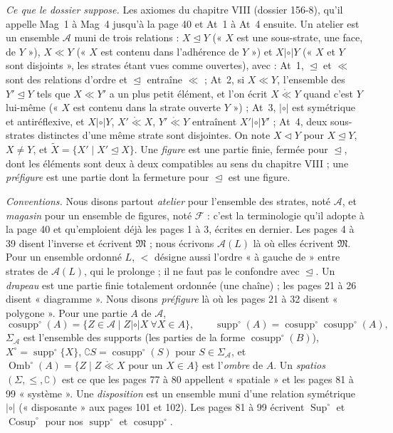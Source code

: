 \documentclass[11pt,a4paper]{article}
\begin{document}
\emph{Ce que le dossier suppose.} Les axiomes du chapitre VIII (dossier 156-8),
qu'il appelle Mag~1 à Mag~4 jusqu'à la page 40 et At~1 à At~4 ensuite. Un
atelier est un ensemble $\mathcal{A}$ muni de trois relations : $X
\trianglelefteq Y$ (« $X$ est une sous-strate, une face, de $Y$ »), $X \ll Y$
(« $X$ est contenu dans l'adhérence de $Y$ ») et $X \mathrel{|\circ|} Y$ (« $X$
et $Y$ sont disjoints », les strates étant vues comme ouvertes), avec : At~1,
$\trianglelefteq$ et $\ll$ sont des relations d'ordre et $\trianglelefteq$
entraîne $\ll$ ; At~2, si $X \ll Y$, l'ensemble des $Y' \trianglelefteq Y$ tels
que $X \ll Y'$ a un plus petit élément, et l'on écrit $X \mathrel{\mathring{\ll}}
Y$ quand c'est $Y$ lui-même (« $X$ est contenu dans la strate ouverte $Y$ ») ;
At~3, $\mathrel{|\circ|}$ est symétrique et antiréflexive, et $X \mathrel{|\circ|}
Y$, $X' \mathrel{\mathring{\ll}} X$, $Y' \mathrel{\mathring{\ll}} Y$ entraînent
$X' \mathrel{|\circ|} Y'$ ; At~4, deux sous-strates distinctes d'une même strate
sont disjointes. On note $X \lhd Y$ pour $X \trianglelefteq Y$, $X \neq Y$, et
$\widetilde{X} = \{X' \mid X' \trianglelefteq X\}$. Une \emph{figure} est une
partie finie, fermée pour $\trianglelefteq$, dont les éléments sont deux à deux
compatibles au sens du chapitre VIII ; une \emph{préfigure} est une partie dont
la fermeture pour $\trianglelefteq$ est une figure.

\emph{Conventions.} Nous disons partout \emph{atelier} pour l'ensemble des
strates, noté $\mathcal{A}$, et \emph{magasin} pour un ensemble de figures,
noté $\mathcal{F}$ : c'est la terminologie qu'il adopte à la page 40 et
qu'emploient déjà les pages 1 à 3, écrites en dernier. Les pages 4 à 39 disent
l'inverse et écrivent $\mathfrak{M}$ ; nous écrivons $\mathcal{A}(L)$ là où
elles écrivent $\mathfrak{M}$. Pour un ensemble ordonné $L$, $<$ désigne aussi
l'ordre « à gauche de » entre strates de $\mathcal{A}(L)$, qui le prolonge ; il
ne faut pas le confondre avec $\trianglelefteq$. Un \emph{drapeau} est une
partie finie totalement ordonnée (une chaîne) ; les pages 21 à 26 disent
« diagramme ». Nous disons \emph{préfigure} là où les pages 21 à 32 disent
« polygone ». Pour une partie $A$ de $\mathcal{A}$,
\[
\operatorname{cosupp}^{\circ}(A) = \{ Z \in \mathcal{A} \mid Z
\mathrel{|\circ|} X \ \forall X \in A \}, \qquad \operatorname{supp}^{\circ}(A)
= \operatorname{cosupp}^{\circ}\operatorname{cosupp}^{\circ}(A),
\]
$\Sigma_{\mathcal{A}}$ est l'ensemble des supports (les parties de la forme
$\operatorname{cosupp}^{\circ}(B)$), $X^{\circ} = \operatorname{supp}^{\circ}\{X\}$,
$\complement S = \operatorname{cosupp}^{\circ}(S)$ pour $S \in
\Sigma_{\mathcal{A}}$, et $\operatorname{Omb}^{\circ}(A) = \{Z \mid Z
\mathrel{\mathring{\ll}} X \text{ pour un } X \in A\}$ est l'\emph{ombre} de $A$.
Un \emph{spatios} $(\Sigma, \leq, \complement)$ est ce que les pages 77 à 80
appellent « spatiale » et les pages 81 à 99 « système ». Une \emph{disposition}
est un ensemble muni d'une relation symétrique $\mathrel{|\circ|}$ (« disposante »
aux pages 101 et 102). Les pages 81 à 99 écrivent $\operatorname{Sup}^{\circ}$ et
$\operatorname{Cosup}^{\circ}$ pour nos $\operatorname{supp}^{\circ}$ et
$\operatorname{cosupp}^{\circ}$.
\end{document}
